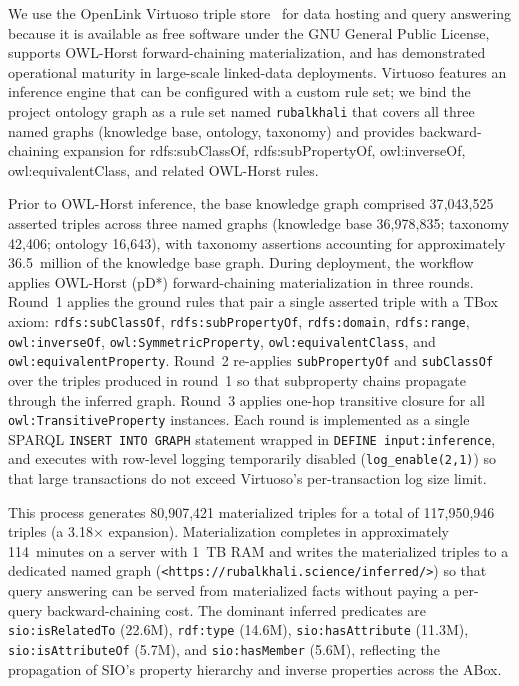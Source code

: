 \documentclass[11pt,a4paper]{article}
\begin{document}
We use the OpenLink Virtuoso triple store~\cite{virtuoso} for data
hosting and query answering because it is available as free software
under the GNU General Public License, supports OWL-Horst
forward-chaining materialization, and has demonstrated operational
maturity in large-scale linked-data deployments. Virtuoso features an
inference engine that can be configured with a custom rule set; we
bind the project ontology graph as a rule set named
\texttt{rubalkhali} that covers all three named graphs (knowledge
base, ontology, taxonomy) and provides backward-chaining expansion
for rdfs:subClassOf, rdfs:subPropertyOf, owl:inverseOf,
owl:equivalentClass, and related OWL-Horst rules.

Prior to OWL-Horst inference, the base knowledge graph comprised
37{,}043{,}525 asserted triples across three named graphs (knowledge
base 36{,}978{,}835; taxonomy 42{,}406; ontology 16{,}643), with
taxonomy assertions accounting for approximately 36.5~million of the
knowledge base graph. During deployment, the workflow applies
OWL-Horst (pD*) forward-chaining materialization in three rounds.
Round~1 applies the ground rules that pair a single asserted triple
with a TBox axiom: \texttt{rdfs:subClassOf},
\texttt{rdfs:subPropertyOf}, \texttt{rdfs:domain}, \texttt{rdfs:range},
\texttt{owl:inverseOf}, \texttt{owl:SymmetricProperty},
\texttt{owl:equivalentClass}, and
\texttt{owl:equivalentProperty}. Round~2 re-applies
\texttt{subPropertyOf} and \texttt{subClassOf} over the triples
produced in round~1 so that subproperty chains propagate through the
inferred graph. Round~3 applies one-hop transitive closure for all
\texttt{owl:TransitiveProperty} instances. Each round is implemented
as a single SPARQL \texttt{INSERT INTO GRAPH} statement wrapped in
\texttt{DEFINE input:inference}, and executes with row-level logging
temporarily disabled (\texttt{log\_enable(2,1)}) so that large
transactions do not exceed Virtuoso's per-transaction log size limit.

This process generates 80{,}907{,}421 materialized triples for a
total of 117{,}950{,}946 triples (a 3.18$\times$
expansion). Materialization completes in approximately 114~minutes
on a server with 1~TB RAM and writes the materialized triples to a
dedicated named graph (\texttt{<https://rubalkhali.science/inferred/>})
so that query answering can be served from materialized facts
without paying a per-query backward-chaining cost. The dominant
inferred predicates are \texttt{sio:isRelatedTo} (22.6M),
\texttt{rdf:type} (14.6M), \texttt{sio:hasAttribute} (11.3M),
\texttt{sio:isAttributeOf} (5.7M), and \texttt{sio:hasMember} (5.6M),
reflecting the propagation of SIO's property hierarchy and inverse
properties across the ABox.
\end{document}
